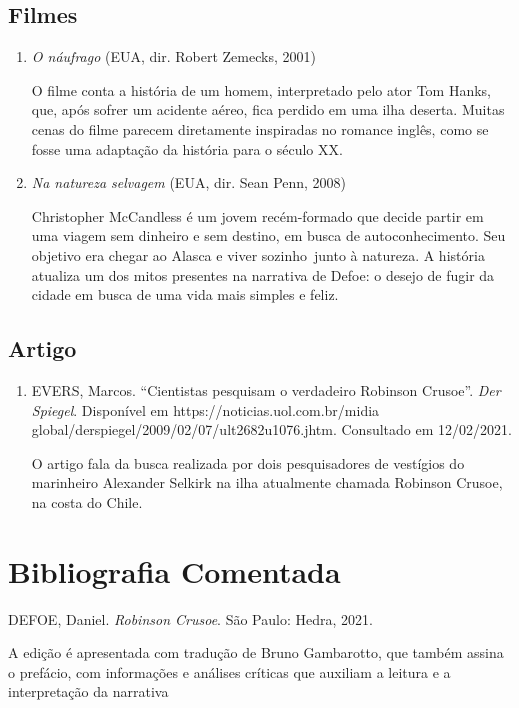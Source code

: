 \documentclass[12pt]{extarticle}
\begin{document}
\subsection{Filmes}

\begin{enumerate}
\item
\emph{O náufrago} (EUA, dir. Robert Zemecks, 2001)

O filme conta a história de um homem, interpretado pelo ator Tom Hanks,
que, após sofrer um acidente aéreo, fica perdido em uma ilha deserta.
Muitas cenas do filme parecem diretamente inspiradas no romance inglês,
como se fosse uma adaptação da história para o século XX.

\item
\emph{Na natureza selvagem} (EUA, dir. Sean Penn, 2008)

Christopher McCandless é um jovem recém-formado que decide partir em uma
viagem sem dinheiro e sem destino, em busca de autoconhecimento. Seu
objetivo era chegar ao Alasca e viver sozinho~junto à natureza. A
história atualiza um dos mitos presentes na narrativa de Defoe: o desejo
de fugir da cidade em busca de uma vida mais simples e feliz.
\end{enumerate}

\subsection{Artigo}

\begin{enumerate}
\item
EVERS, Marcos. ``Cientistas pesquisam o verdadeiro Robinson Crusoe''.
\emph{Der Spiegel}. Disponível em https://noticias.uol.com.br/midia
global/derspiegel/2009/02/07/ult2682u1076.jhtm. Consultado em
12/02/2021.

O artigo fala da busca realizada por dois pesquisadores de vestígios do
marinheiro Alexander Selkirk na ilha atualmente chamada Robinson Crusoe,
na costa do Chile.
\end{enumerate}

\section{Bibliografia Comentada}

DEFOE, Daniel. \emph{Robinson Crusoe}. São Paulo: Hedra, 2021.

A edição é apresentada com tradução de Bruno Gambarotto, que também
assina o prefácio, com informações e análises críticas que auxiliam a
leitura e a interpretação da narrativa
\end{document}
